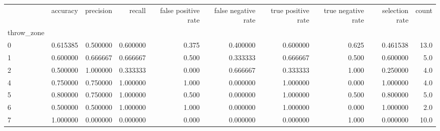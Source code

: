 \begin{tabular}{lrrrrrrrrr}
\toprule
{} &  accuracy &  precision &    recall &  false positive rate &  false negative rate &  true positive rate &  true negative rate &  selection rate &  count \\
throw\_zone &           &            &           &                      &                      &                     &                     &                 &        \\
\midrule
0          &  0.615385 &   0.500000 &  0.600000 &                0.375 &             0.400000 &            0.600000 &               0.625 &        0.461538 &   13.0 \\
1          &  0.600000 &   0.666667 &  0.666667 &                0.500 &             0.333333 &            0.666667 &               0.500 &        0.600000 &    5.0 \\
2          &  0.500000 &   1.000000 &  0.333333 &                0.000 &             0.666667 &            0.333333 &               1.000 &        0.250000 &    4.0 \\
4          &  0.750000 &   0.750000 &  1.000000 &                1.000 &             0.000000 &            1.000000 &               0.000 &        1.000000 &    4.0 \\
5          &  0.800000 &   0.750000 &  1.000000 &                0.500 &             0.000000 &            1.000000 &               0.500 &        0.800000 &    5.0 \\
6          &  0.500000 &   0.500000 &  1.000000 &                1.000 &             0.000000 &            1.000000 &               0.000 &        1.000000 &    2.0 \\
7          &  1.000000 &   0.000000 &  0.000000 &                0.000 &             0.000000 &            0.000000 &               1.000 &        0.000000 &   10.0 \\
\bottomrule
\end{tabular}
